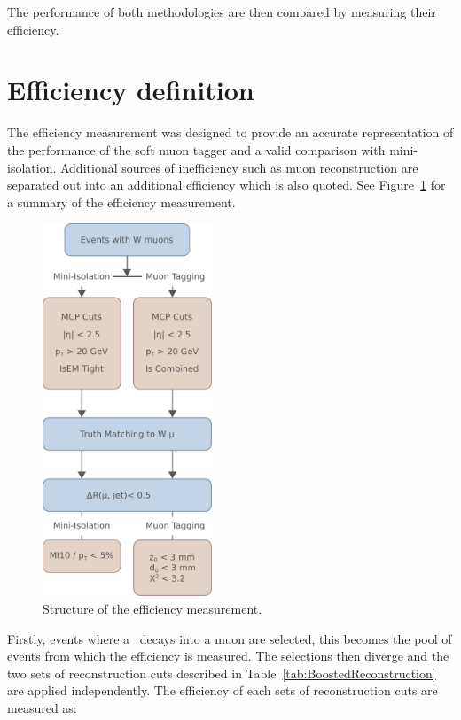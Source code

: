 The performance of both methodologies are then compared by measuring their efficiency.

\section{Efficiency definition} \label{sec:BoostedEfficiencyDefinition}

The efficiency measurement was designed to provide an accurate representation of the performance of the soft muon tagger and a valid comparison with mini-isolation. Additional sources of inefficiency such as muon reconstruction are separated out into an additional efficiency which is also quoted. See Figure~\ref{fig:BoostedFlowChart} for a summary of the efficiency measurement.

\begin{figure}[t][th!]
  \centering
  \includegraphics[width=0.45\textwidth]{PartBoosted/Plots/FlowChart.pdf}
  \caption{Structure of the efficiency measurement.} \label{fig:BoostedFlowChart}
\end{figure}

Firstly, events where a \W\ decays into a muon are selected, this becomes the pool of events from which the efficiency is measured. The selections then diverge and the two sets of reconstruction cuts described in Table~\ref{tab:BoostedReconstruction} are applied independently. The efficiency of each sets of reconstruction cuts are measured as:


